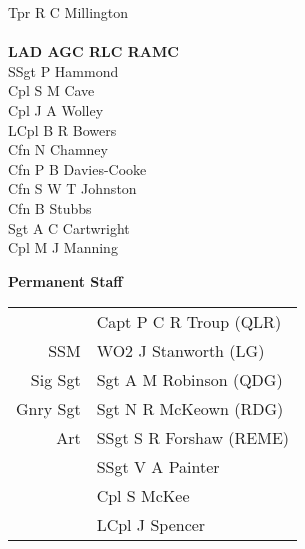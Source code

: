 \begin{multicols}{3}
  Tpr R C Millington \\
  \\
  \textbf{LAD AGC RLC RAMC} \\
  SSgt P Hammond \\
  Cpl S M Cave \\
  Cpl J A Wolley \\
  LCpl B R Bowers \\
  Cfn N Chamney \\
  Cfn P B Davies-Cooke \\
  Cfn S W T Johnston \\
  Cfn B Stubbs \\
  Sgt A C Cartwright \\
  Cpl M J Manning \\
\end{multicols}

\pagebreak

\vspace*{20mm}

\begin{center}
  \Large
  \textbf{Permanent Staff}
\end{center}

\begin{center}
  \small
  \begin{tabular}{rl}
    & Capt P C R Troup (QLR) \\
    SSM & WO2 J Stanworth (LG) \\
    Sig Sgt & Sgt A M Robinson (QDG) \\
    Gnry Sgt & Sgt N R McKeown (RDG) \\
    Art & SSgt S R Forshaw (REME) \\
    & SSgt V A Painter \\
    & Cpl S McKee \\
    & LCpl J Spencer \\
  \end{tabular}
\end{center}
